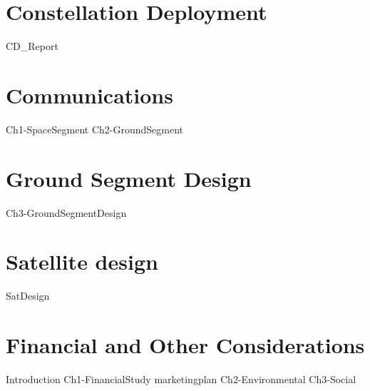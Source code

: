 \part{Constellation Deployment}
{CD_Report}

\part{Communications}
{Ch1-SpaceSegment}
{Ch2-GroundSegment}

\part{Ground Segment Design}
{Ch3-GroundSegmentDesign}

\part{Satellite design}
{SatDesign}

\part{Financial and Other Considerations}
{Introduction}
{Ch1-FinancialStudy}
{marketingplan}
{Ch2-Environmental}
{Ch3-Social}






 

